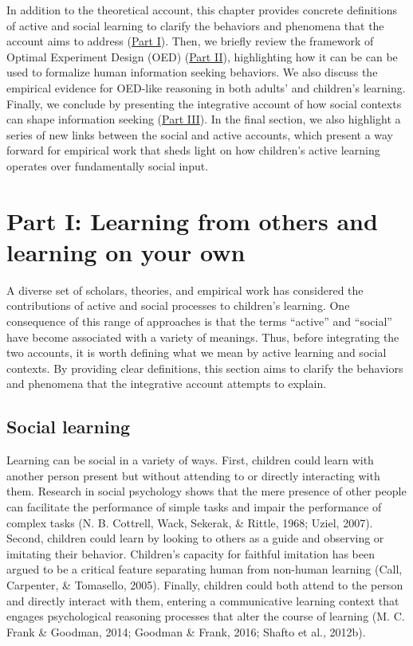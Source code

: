 \documentclass[oneside]{report}
\begin{document}
In addition to the theoretical account, this chapter provides concrete
definitions of active and social learning to clarify the behaviors and
phenomena that the account aims to address
(\protect\hyperlink{scope}{Part I}). Then, we briefly review the
framework of Optimal Experiment Design (OED)
(\protect\hyperlink{oed}{Part II}), highlighting how it can be can be
used to formalize human information seeking behaviors. We also discuss
the empirical evidence for OED-like reasoning in both adults' and
children's learning. Finally, we conclude by presenting the integrative
account of how social contexts can shape information seeking
(\protect\hyperlink{active_social}{Part III}). In the final section, we
also highlight a series of new links between the social and active
accounts, which present a way forward for empirical work that sheds
light on how children's active learning operates over fundamentally
social input.

\hypertarget{scope}{\section{Part I: Learning from others and learning
on your own}\label{scope}}

A diverse set of scholars, theories, and empirical work has considered
the contributions of active and social processes to children's learning.
One consequence of this range of approaches is that the terms ``active''
and ``social'' have become associated with a variety of meanings. Thus,
before integrating the two accounts, it is worth defining what we mean
by active learning and social contexts. By providing clear definitions,
this section aims to clarify the behaviors and phenomena that the
integrative account attempts to explain.

\subsection{Social learning}\label{social-learning}

Learning can be social in a variety of ways. First, children could learn
with another person present but without attending to or directly
interacting with them. Research in social psychology shows that the mere
presence of other people can facilitate the performance of simple tasks
and impair the performance of complex tasks (N. B. Cottrell, Wack,
Sekerak, \& Rittle, 1968; Uziel, 2007). Second, children could learn by
looking to others as a guide and observing or imitating their behavior.
Children's capacity for faithful imitation has been argued to be a
critical feature separating human from non-human learning (Call,
Carpenter, \& Tomasello, 2005). Finally, children could both attend to
the person and directly interact with them, entering a communicative
learning context that engages psychological reasoning processes that
alter the course of learning (M. C. Frank \& Goodman, 2014; Goodman \&
Frank, 2016; Shafto et al., 2012b).
\end{document}
